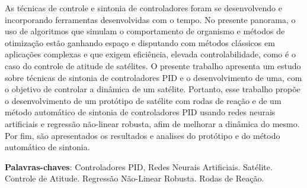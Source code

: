 \setlength{\absparsep}{18pt} %
\begin{resumo}
    As técnicas de controle e sintonia de controladores foram se desenvolvendo e incorporando ferramentas desenvolvidas com o tempo. No presente panorama, o  uso de algoritmos que simulam o comportamento de organismo e métodos de otimização estão ganhando espaço e disputando com métodos clássicos em aplicações complexas e que exigem eficiência, elevada controlabilidade, como é o caso do controle de atitude de satélites. O presente trabalho apresenta um estudo sobre técnicas de sintonia de controladores PID e o desenvolvimento de uma, com o objetivo de controlar a dinâmica de um satélite. Portanto, esse trabalho propõe o desenvolvimento de um protótipo de satélite com rodas de reação e de um método automático de sintonia de controladores PID usando redes neurais artificiais e regressão não-linear robusta, afim de melhorar a dinâmica do mesmo. Por fim, são apresentados os resultados e analises do protótipo e do método automático de sintonia.
	\vspace{\onelineskip}
	\noindent 
	
	\textbf{Palavras-chaves}: Controladores PID, Redes Neurais Artificiais. Satélite. Controle de Atitude. Regressão Não-Linear Robusta. Rodas de Reação. 
\end{resumo}

 
